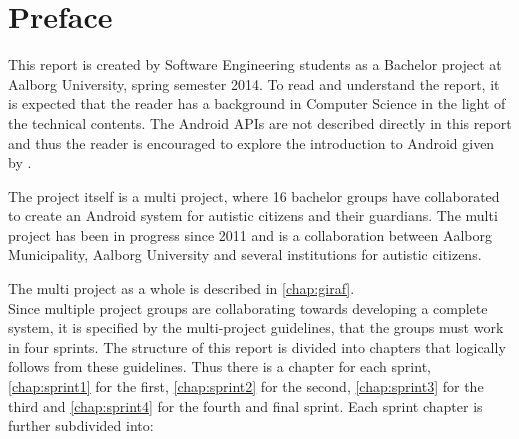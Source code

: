 \newcommand{\headerPreface}{Preface}
\cleardoublepage
{}
\pdfbookmark{\headerPreface}{chap:preface}
\chapter*{\headerPreface}\label{chap:preface}











This report is created by Software Engineering students as a Bachelor project at Aalborg University, spring semester 2014.
To read and understand the report, it is expected that the reader has a background in Computer Science in the light of the technical contents.
The Android APIs are not described directly in this report and thus the reader is encouraged to explore the introduction to Android given by \citet{androidIntroduction}.

The project itself is a multi project, where 16 bachelor groups have collaborated to create an Android system for autistic citizens and their guardians.
The multi project has been in progress since 2011 and is a collaboration between Aalborg Municipality, Aalborg University and several institutions for autistic citizens.

The multi project as a whole is described in \cref{chap:giraf}.\\

Since multiple project groups are collaborating towards developing a complete system, it is specified by the multi-project guidelines, that the groups must work in four sprints.
The structure of this report is divided into chapters that logically follows from these guidelines.
Thus there is a chapter for each sprint, \cref{chap:sprint1} for the first, \cref{chap:sprint2} for the second, \cref{chap:sprint3} for the third and \cref{chap:sprint4} for the fourth and final sprint.
Each sprint chapter is further subdivided into:

